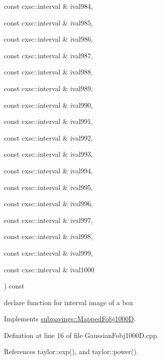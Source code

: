 {{\begin{DoxyParamCaption}
\item[{const cxsc\-::interval \&}]{ival984, }
\item[{const cxsc\-::interval \&}]{ival985, }
\item[{const cxsc\-::interval \&}]{ival986, }
\item[{const cxsc\-::interval \&}]{ival987, }
\item[{const cxsc\-::interval \&}]{ival988, }
\item[{const cxsc\-::interval \&}]{ival989, }
\item[{const cxsc\-::interval \&}]{ival990, }
\item[{const cxsc\-::interval \&}]{ival991, }
\item[{const cxsc\-::interval \&}]{ival992, }
\item[{const cxsc\-::interval \&}]{ival993, }
\item[{const cxsc\-::interval \&}]{ival994, }
\item[{const cxsc\-::interval \&}]{ival995, }
\item[{const cxsc\-::interval \&}]{ival996, }
\item[{const cxsc\-::interval \&}]{ival997, }
\item[{const cxsc\-::interval \&}]{ival998, }
\item[{const cxsc\-::interval \&}]{ival999, }
\item[{const cxsc\-::interval \&}]{ival1000}
\end{DoxyParamCaption}
) const}}\label{classGaussianFobj1000D_ae88cda6fd5feb67043212f85e9d48205}


declare function for interval image of a box 



\-Implements \hyperlink{classsubpavings_1_1MappedFobj1000D_a670902de15082329951f7992f5017205}{subpavings\-::\-Mapped\-Fobj1000\-D}.



\-Definition at line 16 of file \-Gaussian\-Fobj1000\-D.\-cpp.



\-References taylor\-::exp(), and taylor\-::power().


